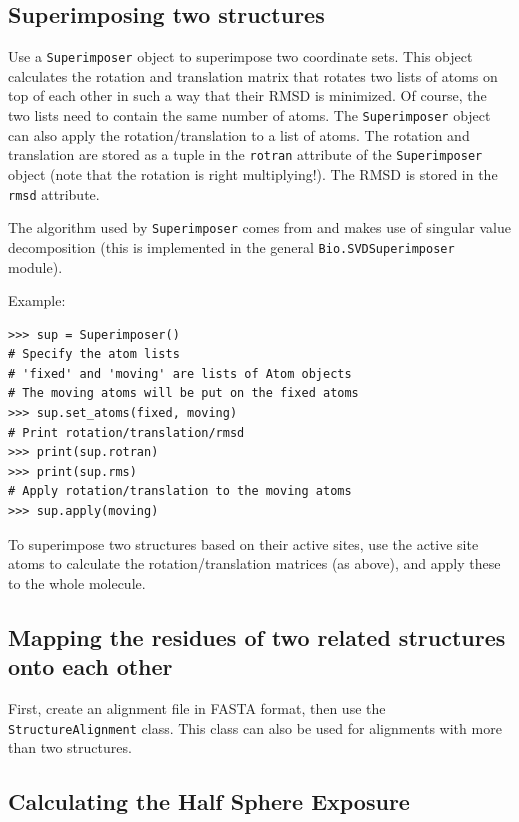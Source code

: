 \subsection{Superimposing two structures}

Use a \texttt{Superimposer} object to superimpose two coordinate sets.
This object calculates the rotation and translation matrix that rotates
two lists of atoms on top of each other in such a way that their RMSD
is minimized. Of course, the two lists need to contain the same number
of atoms. The \texttt{Superimposer} object can also apply the rotation/translation
to a list of atoms. The rotation and translation are stored as a tuple
in the \texttt{rotran} attribute of the \texttt{Superimposer} object
(note that the rotation is right multiplying!). The RMSD is stored
in the \texttt{rmsd} attribute.

The algorithm used by \texttt{Superimposer} comes from \cite[Golub \& Van Loan]{golub1989} and makes use of singular value decomposition (this is implemented in the general \texttt{Bio.SVDSuperimposer} module).

Example:

\begin{verbatim}
>>> sup = Superimposer()
# Specify the atom lists
# 'fixed' and 'moving' are lists of Atom objects
# The moving atoms will be put on the fixed atoms
>>> sup.set_atoms(fixed, moving)
# Print rotation/translation/rmsd
>>> print(sup.rotran)
>>> print(sup.rms)
# Apply rotation/translation to the moving atoms
>>> sup.apply(moving)
\end{verbatim}

To superimpose two structures based on their active sites, use the active site atoms to calculate the rotation/translation matrices (as above), and apply these to the whole molecule.

\subsection{Mapping the residues of two related structures onto each other}

First, create an alignment file in FASTA format, then use the \texttt{StructureAlignment}
class. This class can also be used for alignments with more than two
structures.

\subsection{Calculating the Half Sphere Exposure}

